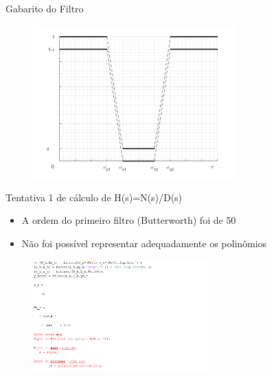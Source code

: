 \begin{frame}{Gabarito do Filtro}
    	\begin{figure}[!htb]
        \includegraphics[width=0.7\textwidth]{graficos/gabarito.png}
        \end{figure} 
\end{frame}

\begin{frame}{Tentativa 1 de cálculo de H(s)=N(s)/D(s)}
\begin{itemize}
    \item A ordem do primeiro filtro (Butterworth) foi de 50
    \item Não foi possível representar adequadamente os polinômios
    
\end{itemize}
    \begin{figure}[!htb]
    \includegraphics[width=0.6\textwidth]{graficos/num_dem_try_1_erro.png}
    \end{figure}
    
\end{frame}

